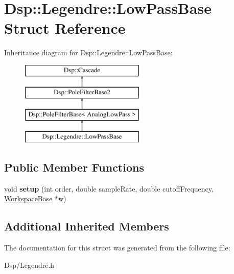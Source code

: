 \hypertarget{structDsp_1_1Legendre_1_1LowPassBase}{\section{Dsp\-:\-:Legendre\-:\-:Low\-Pass\-Base Struct Reference}
\label{structDsp_1_1Legendre_1_1LowPassBase}
}
Inheritance diagram for Dsp\-:\-:Legendre\-:\-:Low\-Pass\-Base\-:\begin{figure}[H]
\begin{center}
\leavevmode
\includegraphics[height=4.000000cm]{structDsp_1_1Legendre_1_1LowPassBase}
\end{center}
\end{figure}
\subsection*{Public Member Functions}
\begin{DoxyCompactItemize}
\item 
\hypertarget{structDsp_1_1Legendre_1_1LowPassBase_a4663ac325a8f54781d0a48d3e0908575}{void {\bfseries setup} (int order, double sample\-Rate, double cutoff\-Frequency, \hyperlink{structDsp_1_1Legendre_1_1WorkspaceBase}{Workspace\-Base} $\ast$w)}\label{structDsp_1_1Legendre_1_1LowPassBase_a4663ac325a8f54781d0a48d3e0908575}

\end{DoxyCompactItemize}
\subsection*{Additional Inherited Members}


The documentation for this struct was generated from the following file\-:\begin{DoxyCompactItemize}
\item 
Dsp/Legendre.\-h\end{DoxyCompactItemize}
